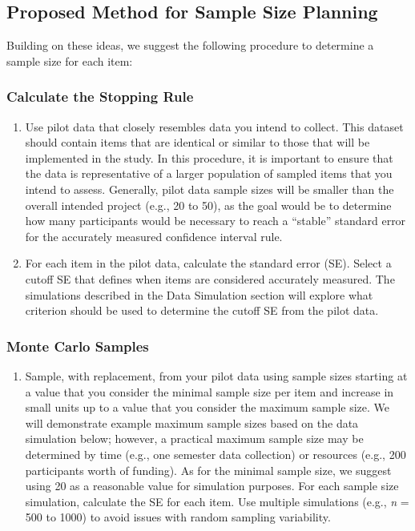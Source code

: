 \documentclass[
  man]{apa7}
\providecommand{\tightlist}{%
  \setlength{\itemsep}{0pt}\setlength{\parskip}{0pt}}
\begin{document}
\subsection{Proposed Method for Sample Size Planning}\label{proposed-method-for-sample-size-planning}

Building on these ideas, we suggest the following procedure to determine a sample size for each item:

\subsubsection{Calculate the Stopping Rule}\label{calculate-the-stopping-rule}

\begin{enumerate}
\def\labelenumi{\arabic{enumi})}
\item
  Use pilot data that closely resembles data you intend to collect. This dataset should contain items that are identical or similar to those that will be implemented in the study. In this procedure, it is important to ensure that the data is representative of a larger population of sampled items that you intend to assess. Generally, pilot data sample sizes will be smaller than the overall intended project (e.g., 20 to 50), as the goal would be to determine how many participants would be necessary to reach a ``stable'' standard error for the accurately measured confidence interval rule.
\item
  For each item in the pilot data, calculate the standard error (SE). Select a cutoff SE that defines when items are considered accurately measured. The simulations described in the Data Simulation section will explore what criterion should be used to determine the cutoff SE from the pilot data.
\end{enumerate}

\subsubsection{Monte Carlo Samples}\label{monte-carlo-samples}

\begin{enumerate}
\def\labelenumi{\arabic{enumi})}
\setcounter{enumi}{2}
\tightlist
\item
  Sample, with replacement, from your pilot data using sample sizes starting at a value that you consider the minimal sample size per item and increase in small units up to a value that you consider the maximum sample size. We will demonstrate example maximum sample sizes based on the data simulation below; however, a practical maximum sample size may be determined by time (e.g., one semester data collection) or resources (e.g., 200 participants worth of funding). As for the minimal sample size, we suggest using 20 as a reasonable value for simulation purposes. For each sample size simulation, calculate the SE for each item. Use multiple simulations (e.g., \emph{n} = 500 to 1000) to avoid issues with random sampling variability.
\end{enumerate}
\end{document}
